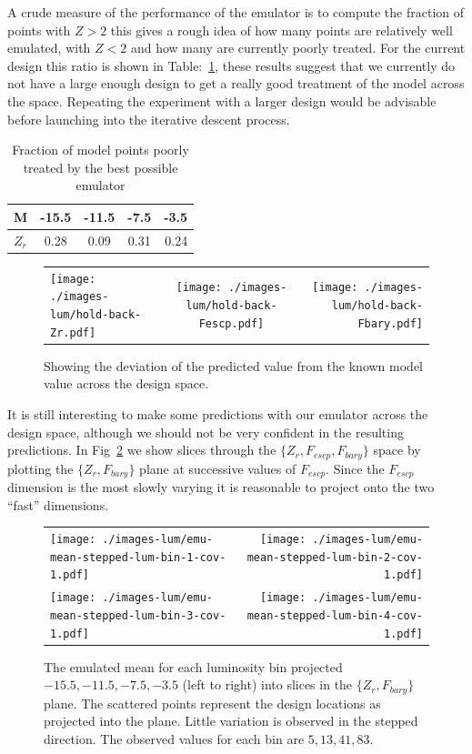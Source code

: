 \documentclass[11pt]{article}
\begin{document}
A crude measure of the performance of the emulator is to compute the fraction of points with  $Z > 2$ this gives a rough idea of how many points are relatively well emulated, with $Z < 2$ and how many are currently poorly treated. For the current design this ratio is shown in Table:~\ref{tab-z-ratios-lum}, these results suggest that we currently do not have a large enough design to get a really good treatment of the model across the space. Repeating the experiment with a larger design would be advisable before launching into the iterative descent process.

\begin{table}
\begin{center}
\begin{tabular}{l c c c r}
M & -15.5 & -11.5 & -7.5 & -3.5 \\
\hline
$Z_r$ & 0.28 & 0.09 & 0.31 & 0.24 \\
\end{tabular}
\caption{Fraction of model points poorly treated by the best possible emulator}
\label{tab-z-ratios-lum}
\end{center}
\end{table}

\begin{figure}
  \begin{tabular}{l c r}
    \texttt{[image: ./images-lum/hold-back-Zr.pdf]}  &
    \texttt{[image: ./images-lum/hold-back-Fescp.pdf]}  & 
    \texttt{[image: ./images-lum/hold-back-Fbary.pdf]}
  \end{tabular}
  \caption{Showing the deviation of the predicted value from the known model value across the design space.}
  \label{fig-deviates-lum-fun}
\end{figure}

It is still interesting to make some predictions with our emulator across the design space, although we should not be very confident in the resulting predictions. In Fig~\ref{fig-emulator-slices} we show slices through the $\{Z_r, F_{escp}, F_{bary}\}$ space by plotting the $\{Z_r, F_{bary}\}$ plane at successive values of $F_{escp}$. Since the $F_{escp}$ dimension is the most slowly varying it is reasonable to project onto the two ``fast'' dimensions. 

\begin{figure}
  \begin{tabular}{l r} 
    \texttt{[image: ./images-lum/emu-mean-stepped-lum-bin-1-cov-1.pdf]} &
    \texttt{[image: ./images-lum/emu-mean-stepped-lum-bin-2-cov-1.pdf]} \\
    \texttt{[image: ./images-lum/emu-mean-stepped-lum-bin-3-cov-1.pdf]} &
    \texttt{[image: ./images-lum/emu-mean-stepped-lum-bin-4-cov-1.pdf]} \\
  \end{tabular}
  \caption{The emulated mean for each luminosity bin projected $-15.5, -11.5, -7.5, -3.5$ (left to right) into slices in the $\{Z_r, F_{bary}\}$ plane. The scattered points represent the design locations as projected into the plane. Little variation is observed in the stepped direction. The observed values for each bin are $5, 13, 41, 83$.}
  \label{fig-emulator-slices}
\end{figure}
\end{document}
